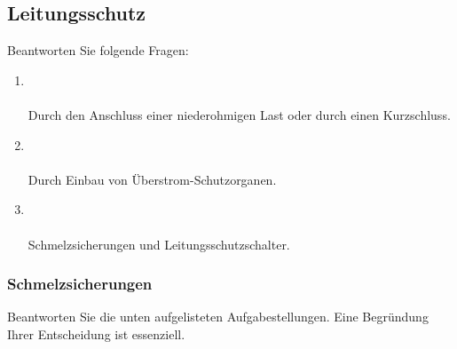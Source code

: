 \subsection{Leitungsschutz}
Beantworten Sie folgende Fragen:

\begin{enumerate}
    \item   {} \\\\
            Durch den Anschluss einer niederohmigen Last oder durch einen Kurzschluss.
    \item   {} \\\\
            Durch Einbau von Überstrom-Schutzorganen.
    \item   {} \\\\
            Schmelzsicherungen und Leitungsschutzschalter.
\end{enumerate}

\subsubsection{Schmelzsicherungen}
Beantworten Sie die unten aufgelisteten Aufgabestellungen. Eine Begründung Ihrer Entscheidung ist essenziell.

